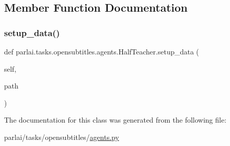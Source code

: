 \subsection{Member Function Documentation}
\mbox{\label{classparlai_1_1tasks_1_1opensubtitles_1_1agents_1_1HalfTeacher_a36081b74536cdad3bc3673b324da1f02}} 
\subsubsection{\texorpdfstring{setup\+\_\+data()}{setup\_data()}}
{\footnotesize\ttfamily def parlai.\+tasks.\+opensubtitles.\+agents.\+Half\+Teacher.\+setup\+\_\+data (\begin{DoxyParamCaption}\item[{}]{self,  }\item[{}]{path }\end{DoxyParamCaption})}



The documentation for this class was generated from the following file\+:\begin{DoxyCompactItemize}
\item 
parlai/tasks/opensubtitles/\hyperlink{parlai_2tasks_2opensubtitles_2agents_8py}{agents.\+py}\end{DoxyCompactItemize}
